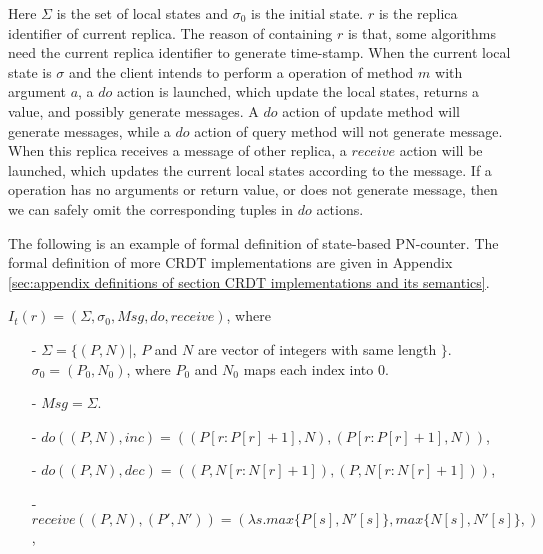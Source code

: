 Here $\Sigma$ is the set of local states and $\sigma_0$ is the initial state. $r$ is the replica identifier of current replica. The reason of containing $r$ is that, some algorithms need the current replica identifier to generate time-stamp. When the current local state is $\sigma$ and the client intends to perform a operation of method $m$ with argument $a$, a $\mathit{do}$ action is launched, which update the local states, returns a value, and possibly generate messages. A $\mathit{do}$ action of update method will generate messages, while a $\mathit{do}$ action of query method will not generate message. When this replica receives a message of other replica, a $\mathit{receive}$ action will be launched, which updates the current local states according to the message. If a operation has no arguments or return value, or does not generate message, then we can safely omit the corresponding tuples in $\mathit{do}$ actions.

The following is an example of formal definition of state-based PN-counter. The formal definition of more CRDT implementations are given in Appendix \ref{sec:appendix definitions of section CRDT implementations and its semantics}.

\begin{example}
\label{definition:state-based PN-counter}
$I_t(r) = (\Sigma, \sigma_0, \mathit{Msg}, \mathit{do},\mathit{receive})$, where

\begin{itemize}
\setlength{\itemsep}{0.5pt}
\item[-] $\Sigma = \{ (P,N) \vert$, $P$ and $N$ are vector of integers with same length $\}$. $\sigma_0 = (P_0,N_0)$, where $P_0$ and $N_0$ maps each index into $0$.

\item[-] $\mathit{Msg} = \Sigma$.

\item[-] $\mathit{do}((P,N),\mathit{inc}) = ((P[r:P[r]+1],N),(P[r:P[r]+1],N))$,

\item[-] $\mathit{do}((P,N),\mathit{dec}) = ((P,N[r:N[r]+1]),(P,N[r:N[r]+1]))$,

\item[-] $\mathit{receive}((P,N),(P',N')) = (\lambda s. \mathit{max}\{  P[s], N'[s] \}, \mathit{max}\{  N[s], N'[s] \},)$,
\end{itemize}
\end{example}





